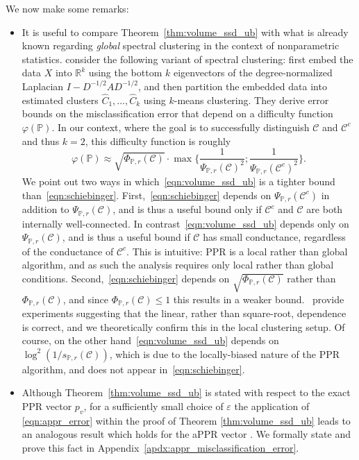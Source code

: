 \documentclass[11pt,twoside]{article}
\newcommand{\Reals}{\mathbb{R}}
\newcommand{\1}{\mathbf{1}}
\newcommand{\mc}[1]{\mathcal{#1}}
\newcommand{\Pbb}{\mathbb{P}}
\newcommand{\wh}[1]{\widehat{#1}}
\begin{document}
We now make some remarks:
\begin{itemize}
	\item It is useful to compare Theorem~\ref{thm:volume_ssd_ub} with what is already known regarding \emph{global} spectral clustering in the context of nonparametric statistics. \cite{schiebinger2015} consider the following variant of spectral clustering: first embed the data $X$ into $\Reals^{k}$ using the bottom $k$ eigenvectors of the degree-normalized Laplacian $I - D^{-1/2}AD^{-1/2}$, and then partition the embedded data into estimated clusters $\wh{C}_1,\ldots,\wh{C}_k$  using $k$-means clustering. They derive error bounds on the misclassification error that depend on a difficulty function $\varphi(\Pbb)$. In our context, where the goal is to successfully distinguish $\mc{C}$ and $\mc{C}^c$ and thus $k = 2$, this difficulty function is roughly
	\begin{equation}
	\label{eqn:schiebinger}
	\varphi(\Pbb) \approx \sqrt{\Phi_{\Pbb,r}(\mc{C})} \cdot \max\biggl\{ \frac{1}{\Psi_{\Pbb,r}(\mc{C})^2}; \frac{1}{\Psi_{\Pbb,r}(\mc{C}^c)^2}\biggr\}.
	\end{equation}
	We point out two ways in which~\eqref{eqn:volume_ssd_ub} is a tighter bound than~\eqref{eqn:schiebinger}. First,~\eqref{eqn:schiebinger} depends on $\Psi_{\Pbb,r}(\mc{C}^c)$ in addition to $\Psi_{\Pbb,r}(\mc{C})$, and is thus a useful bound only if $\mc{C}^c$ and $\mc{C}$ are both internally well-connected. In contrast~\eqref{eqn:volume_ssd_ub} depends only on $\Psi_{\Pbb,r}(\mc{C})$, and is thus a useful bound if $\mc{C}$ has small conductance, regardless of the conductance of $\mc{C}^c$. This is intuitive: PPR is a local rather than global algorithm, and as such the analysis requires only local rather than global conditions. Second,~\eqref{eqn:schiebinger} depends on $\sqrt{\Phi_{\Pbb,r}(\mc{C})}$ rather than $\Phi_{\Pbb,r}(\mc{C})$, and since $\Phi_{\Pbb,r}(\mc{C}) \leq 1$ this results in a weaker bound.~\citep{schiebinger2015} provide experiments suggesting that the linear, rather than square-root, dependence is correct, and we theoretically confirm this in the local clustering setup. Of course, on the other hand~\eqref{eqn:volume_ssd_ub} depends on $\log^2(1/s_{\Pbb,r}(\mc{C}))$, which is due to the locally-biased nature of the PPR algorithm, and does not appear in~\eqref{eqn:schiebinger}.
	
	\item Although Theorem~\ref{thm:volume_ssd_ub} is stated with respect to the exact PPR vector $p_v$, for a sufficiently small choice of $\varepsilon$ the 
	application of \eqref{eqn:appr_error} within the proof of Theorem
	\ref{thm:volume_ssd_ub} leads to an analogous result which holds for the aPPR vector . We formally state and prove this fact in Appendix~\ref{apdx:appr_misclassification_error}.
\end{itemize}
\end{document}
